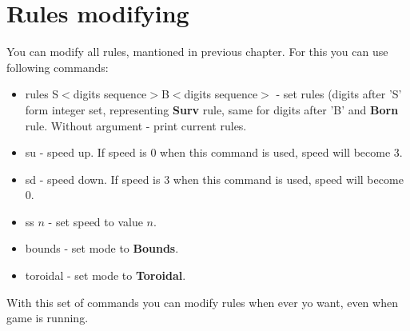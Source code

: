 \chapter*{Rules modifying}

You can modify all rules, mantioned in previous chapter. For this you can use following commands:

\begin{itemize}
	\item \textsf{rules S$<$digits sequence$>$B$<$digits sequence$>$} - set rules (digits after 'S' form integer set, representing \textbf{Surv} rule, same for digits after 'B' and \textbf{Born} rule. Without argument - print current rules.
	\item \textsf{su} - speed up. If speed is 0 when this command is used, speed will become 3.
	\item \textsf{sd} - speed down. If speed is 3 when this command is used, speed will become 0.
	\item \textsf{ss $n$} - set speed to value $n$.
	\item \textsf{bounds} - set mode to \textbf{Bounds}.
	\item \textsf{toroidal} - set mode to \textbf{Toroidal}.
\end{itemize}

With this set of commands you can modify rules when ever yo want, even when game is running.

